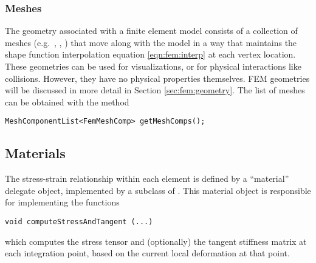 \subsubsection{Meshes}
\ifLaTeXML{\newline}

The geometry associated with a finite element model consists of a collection
of meshes (e.g.~, ,
) that move along with the
model in a way that maintains the shape function interpolation equation 
\eqref{eqn:fem:interp}
at each vertex location.  These geometries can be used for visualizations, or 
for physical interactions like collisions.  However, they have no physical 
properties themselves. FEM geometries will be discussed in more detail in 
Section \ref{sec:fem:geometry}.  The list of meshes can be obtained with the 
method
\begin{lstlisting}[]
  MeshComponentList<FemMeshComp> getMeshComps();
\end{lstlisting}

\subsection{Materials}
\label{sec:fem:materials}

The stress-strain relationship within each element is defined by a ``material''
delegate object, implemented by a subclass of 
.  This material object is 
responsible for implementing the functions
%
\begin{lstlisting}[]
   void computeStressAndTangent (...)
\end{lstlisting}
%
which computes the stress tensor and (optionally) the tangent stiffness
matrix at each integration point, based on the current local
deformation at that point.

